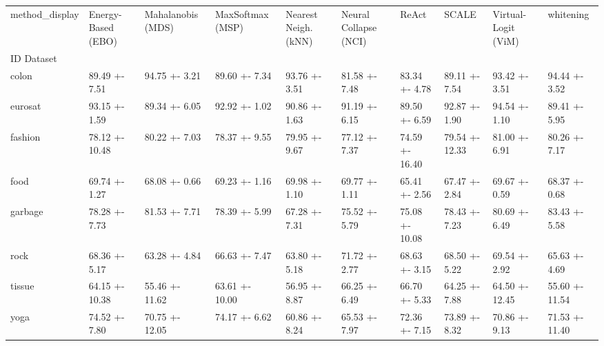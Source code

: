 \begin{tabular}{llllllllll}
\toprule
method_display & Energy-Based (EBO) & Mahalanobis (MDS) & MaxSoftmax (MSP) & Nearest Neigh. (kNN) & Neural Collapse (NCI) & ReAct & SCALE & Virtual-Logit (ViM) & whitening \\
ID Dataset &  &  &  &  &  &  &  &  &  \\
\midrule
colon & 89.49 +- 7.51 & 94.75 +- 3.21 & 89.60 +- 7.34 & 93.76 +- 3.51 & 81.58 +- 7.48 & 83.34 +- 4.78 & 89.11 +- 7.54 & 93.42 +- 3.51 & 94.44 +- 3.52 \\
eurosat & 93.15 +- 1.59 & 89.34 +- 6.05 & 92.92 +- 1.02 & 90.86 +- 1.63 & 91.19 +- 6.15 & 89.50 +- 6.59 & 92.87 +- 1.90 & 94.54 +- 1.10 & 89.41 +- 5.95 \\
fashion & 78.12 +- 10.48 & 80.22 +- 7.03 & 78.37 +- 9.55 & 79.95 +- 9.67 & 77.12 +- 7.37 & 74.59 +- 16.40 & 79.54 +- 12.33 & 81.00 +- 6.91 & 80.26 +- 7.17 \\
food & 69.74 +- 1.27 & 68.08 +- 0.66 & 69.23 +- 1.16 & 69.98 +- 1.10 & 69.77 +- 1.11 & 65.41 +- 2.56 & 67.47 +- 2.84 & 69.67 +- 0.59 & 68.37 +- 0.68 \\
garbage & 78.28 +- 7.73 & 81.53 +- 7.71 & 78.39 +- 5.99 & 67.28 +- 7.31 & 75.52 +- 5.79 & 75.08 +- 10.08 & 78.43 +- 7.23 & 80.69 +- 6.49 & 83.43 +- 5.58 \\
rock & 68.36 +- 5.17 & 63.28 +- 4.84 & 66.63 +- 7.47 & 63.80 +- 5.18 & 71.72 +- 2.77 & 68.63 +- 3.15 & 68.50 +- 5.22 & 69.54 +- 2.92 & 65.63 +- 4.69 \\
tissue & 64.15 +- 10.38 & 55.46 +- 11.62 & 63.61 +- 10.00 & 56.95 +- 8.87 & 66.25 +- 6.49 & 66.70 +- 5.33 & 64.25 +- 7.88 & 64.50 +- 12.45 & 55.60 +- 11.54 \\
yoga & 74.52 +- 7.80 & 70.75 +- 12.05 & 74.17 +- 6.62 & 60.86 +- 8.24 & 65.53 +- 7.97 & 72.36 +- 7.15 & 73.89 +- 8.32 & 70.86 +- 9.13 & 71.53 +- 11.40 \\
\bottomrule
\end{tabular}
